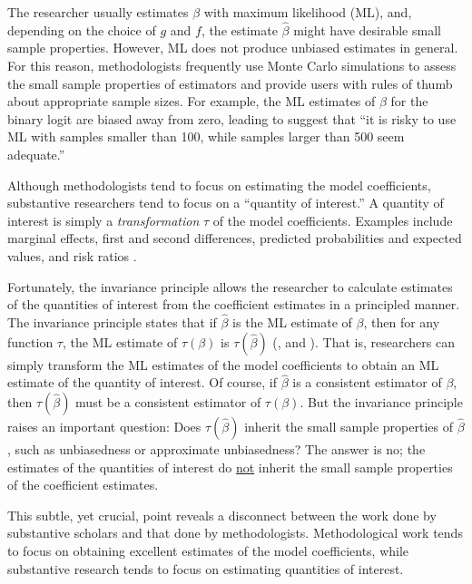 \documentclass[12pt]{article}
\begin{document}
The researcher usually estimates $\beta$ with maximum likelihood (ML), and, depending on the choice of $g$ and $f$, the estimate $\hat{\beta}$ might have desirable small sample properties. 
However, ML does not produce unbiased estimates in general. 
For this reason, methodologists frequently use Monte Carlo simulations to assess the small sample properties of estimators and provide users with rules of thumb about appropriate sample sizes.
For example, the ML estimates of $\beta$ for the binary logit are biased away from zero, leading \citet[p. 54]{Long1997} to suggest that ``it is risky to use ML with samples smaller than 100, while samples larger than 500 seem adequate.''

Although methodologists tend to focus on estimating the model coefficients, substantive researchers tend to focus on a ``quantity of interest.'' 
A quantity of interest is simply a \textit{transformation} $\tau$ of the model coefficients. 
Examples include marginal effects, first and second differences, predicted probabilities and expected values, and risk ratios \citep{KingTomzWittenberg2000}. 

Fortunately, the invariance principle allows the researcher to calculate estimates of the quantities of interest from the coefficient estimates in a principled manner.
The invariance principle states that if $\hat{\beta}$ is the ML estimate of $\beta$, then for any function $\tau$, the ML estimate of $\tau(\beta)$ is $\tau(\hat{\beta})$ (\citealt[pp. 75-76]{King1989}, and \citealt[pp. 320-321]{CasellaBerger2002}).
That is, researchers can simply transform the ML estimates of the model coefficients to obtain an ML estimate of the quantity of interest.
Of course, if $\hat{\beta}$ is a consistent estimator of $\beta$, then $\tau(\hat{\beta})$ must be a consistent estimator of $\tau(\beta)$. 
But the invariance principle raises an important question: Does $\tau(\hat{\beta})$ inherit the small sample properties of $\hat{\beta}$, such as unbiasedness or approximate unbiasedness?
The answer is no; the estimates of the quantities of interest do \underline{not} inherit the small sample properties of the coefficient estimates. 

This subtle, yet crucial, point reveals a disconnect between the work done by substantive scholars and that done by methodologists. 
Methodological work tends to focus on obtaining excellent estimates of the model coefficients, while substantive research tends to focus on estimating quantities of interest. 
\end{document}
